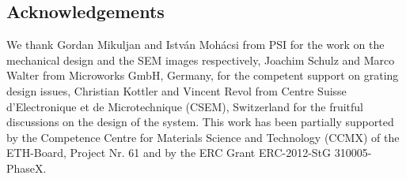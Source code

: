 \documentclass[a0,portrait]{a0poster}
\begin{document}
\begin{multicols}{2}

\section*{Acknowledgements}

We thank Gordan Mikuljan and István Mohácsi from PSI for the
work on the mechanical design and the SEM images
respectively, Joachim Schulz and Marco Walter from
Microworks GmbH, Germany, for the competent support on grating design
issues, Christian Kottler and Vincent Revol from Centre Suisse
d'Electronique et de Microtechnique (CSEM), Switzerland for the fruitful
discussions on the design of the system. This work has been partially
supported by the Competence Centre for Materials Science and Technology
(CCMX) of the ETH-Board, Project Nr. 61 and by the ERC Grant ERC-2012-StG 310005-PhaseX.
\end{multicols}
\end{document}
